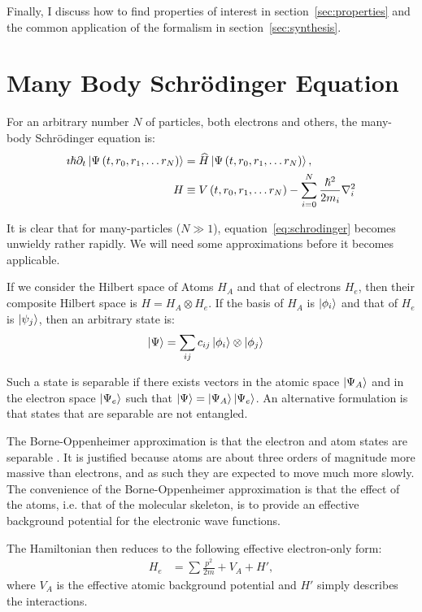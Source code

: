 Finally, I discuss how to find properties of interest in section~\ref{sec:properties} and the common application of the formalism in section~\ref{sec:synthesis}.

\section{Many Body Schr\"odinger Equation}
\label{sec:schrodinger}

For an arbitrary number $N$ of particles, both electrons and others, the many-body Schr\"odinger equation is:
\begin{align}
 \imath \hslash \partial_t\ket{\Psi\left(t, r_0, r_1, \ldots r_N\right)} &= \widehat{H} \ket{\Psi\left(t, r_0, r_1, \ldots r_N\right)} \label{eq:schrodinger}, \\
 H &\equiv V\left(t, r_0, r_1, \ldots r_N\right) - \sum_{i=0}^N \frac{\hslash^2}{2m_i} \nabla_i^2
\end{align}

It is clear that for many-particles ($N\gg 1$), equation~\ref{eq:schrodinger} becomes unwieldy rather rapidly. We will need some approximations before it becomes applicable.

If we consider the Hilbert space of Atoms $H_A$ and that of electrons $H_e$, then their composite Hilbert space is $H = H_A \otimes H_e$. If the basis of $H_A$ is $\ket{\phi_i}$ and that of $H_e$ is $\ket{\psi_j}$, then an arbitrary state is:
\begin{align}
\ket{\Psi} &= \sum_{ij} c_{ij} \ket{\phi_i} \otimes \ket{\phi_j}
\end{align}

Such a state is separable if there exists vectors in the atomic space $\ket{\Psi_A}$ and in the electron space $\ket{\Psi_e}$ such that $\ket{\Psi} = \ket{\Psi_A} \ket{\Psi_e}$. An alternative formulation is that states that are separable are not entangled.

The Borne-Oppenheimer approximation is that the electron and atom  states are separable \cite{mattuck}. It is justified because atoms are about three orders of magnitude more massive than electrons, and as such they are expected to move much more slowly. The convenience of the Borne-Oppenheimer approximation is that the effect of the atoms, i.e. that of the molecular skeleton, is to provide an effective background potential for the electronic wave functions.

The Hamiltonian then reduces to the following effective electron-only form:
\begin{align}
H_e &= \sum \frac{p^2}{2m} + V_A + H',
\end{align}
where $V_A$ is the effective atomic background potential and $H'$ simply describes the interactions.

